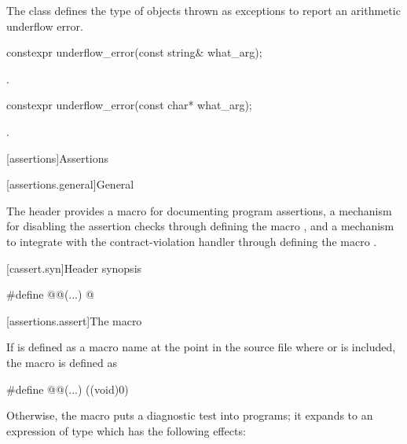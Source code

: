 \pnum
The class
defines the type of objects thrown as exceptions to report an arithmetic underflow error.

%
\begin{itemdecl}
constexpr underflow_error(const string& what_arg);
\end{itemdecl}

\begin{itemdescr}
\pnum
\ensures
{}.
\end{itemdescr}

%
\begin{itemdecl}
constexpr underflow_error(const char* what_arg);
\end{itemdecl}

\begin{itemdescr}
\pnum
\ensures
{}.
\end{itemdescr}

[assertions]{Assertions}

[assertions.general]{General}

\pnum
The header 
provides a macro for
documenting \Cpp{} program assertions,
a mechanism for disabling the assertion checks
through defining the macro ,
and
a mechanism to integrate with the contract-violation handler
through defining the macro .

[cassert.syn]{Header  synopsis}

\begin{codeblock}
#define @@(...) @\seebelow@
\end{codeblock}

[assertions.assert]{The  macro}

\pnum
If  is defined as a macro name
at the point in the source file where
 or 
is included,
the  macro is defined as
\begin{codeblock}
#define @@(...) ((void)0)
\end{codeblock}

\pnum
Otherwise, the  macro puts a diagnostic test into programs;
it expands to an expression of type  which
has the following effects:

